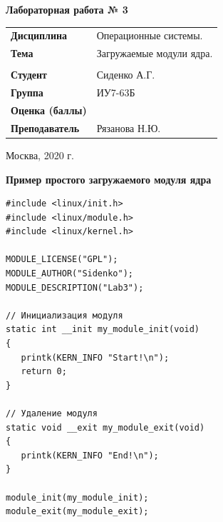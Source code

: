 \documentclass[a4paper,14pt]{extreport} %
\begin{document}
\begin{titlepage}
    \vspace{2cm}

    \begin{center}
        \textbf{Лабораторная работа № 3} \\
        \vspace{0.5cm}
    \end{center}

    \vspace{4cm}

    \begin{flushleft}
        \begin{tabular}{ll}
            \textbf{Дисциплина} & Операционные системы.  \\
            \textbf{Тема} & Загружаемые модули ядра.  \\
            \\
            \textbf{Студент} & Сиденко А.Г. \\
            \textbf{Группа} & ИУ7-63Б \\
            \textbf{Оценка (баллы)} & \\
            \textbf{Преподаватель} & Рязанова Н.Ю.   \\
        \end{tabular}
    \end{flushleft}

    \vspace{4cm}

   \begin{center}
        Москва, 2020 г.
    \end{center}

\end{titlepage}

\textbf{Пример простого загружаемого модуля ядра} 

\begin{lstlisting}
#include <linux/init.h>
#include <linux/module.h>
#include <linux/kernel.h>

MODULE_LICENSE("GPL");
MODULE_AUTHOR("Sidenko");
MODULE_DESCRIPTION("Lab3");

// Инициализация модуля
static int __init my_module_init(void)
{
   printk(KERN_INFO "Start!\n");
   return 0;
}

// Удаление модуля
static void __exit my_module_exit(void)
{
   printk(KERN_INFO "End!\n");
}

module_init(my_module_init);
module_exit(my_module_exit);
\end{lstlisting}
\end{document}
